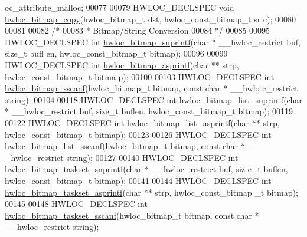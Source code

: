 \begin{DoxyCode}
      oc\_attribute\_malloc;
00077 
00079 HWLOC\_DECLSPEC \textcolor{keywordtype}{void} \hyperlink{a00065_gab14743355fa03b36cef521cbcd2fbf64}{hwloc_bitmap_copy}(hwloc\_bitmap\_t dst, hwloc\_const\_bitmap\_t sr
      c);
00080 
00081 
00082 \textcolor{comment}{/*}
00083 \textcolor{comment}{ * Bitmap/String Conversion}
00084 \textcolor{comment}{ */}
00085 
00095 HWLOC\_DECLSPEC \textcolor{keywordtype}{int} \hyperlink{a00065_ga6c0d60db98f27276752c1e5fafcbd7d1}{hwloc_bitmap_snprintf}(\textcolor{keywordtype}{char} * \_\_hwloc\_restrict buf, \textcolor{keywordtype}{size\_t} bufl
      en, hwloc\_const\_bitmap\_t bitmap);
00096 
00099 HWLOC\_DECLSPEC \textcolor{keywordtype}{int} \hyperlink{a00065_gad3cf87ceb58aa91656756bbb58057320}{hwloc_bitmap_asprintf}(\textcolor{keywordtype}{char} ** strp, hwloc\_const\_bitmap\_t bitma
      p);
00100 
00103 HWLOC\_DECLSPEC \textcolor{keywordtype}{int} \hyperlink{a00065_ga553cd5ceb1925bfd31788e70b4a46ae8}{hwloc_bitmap_sscanf}(hwloc\_bitmap\_t bitmap, const \textcolor{keywordtype}{char} * \_\_hwlo
      c\_restrict \textcolor{keywordtype}{string});
00104 
00118 HWLOC\_DECLSPEC \textcolor{keywordtype}{int} \hyperlink{a00065_gab94b52560ea4333663895b3276e89af2}{hwloc_bitmap_list_snprintf}(\textcolor{keywordtype}{char} * \_\_hwloc\_restrict buf, \textcolor{keywordtype}{size\_t
      } buflen, hwloc\_const\_bitmap\_t bitmap);
00119 
00122 HWLOC\_DECLSPEC \textcolor{keywordtype}{int} \hyperlink{a00065_ga600651f00d39d378f423acbd75d938d2}{hwloc_bitmap_list_asprintf}(\textcolor{keywordtype}{char} ** strp, hwloc\_const\_bitmap\_t 
      bitmap);
00123 
00126 HWLOC\_DECLSPEC \textcolor{keywordtype}{int} \hyperlink{a00065_gafe8fc90e7a9171e287cf1bfa11e85980}{hwloc_bitmap_list_sscanf}(hwloc\_bitmap\_t bitmap, const \textcolor{keywordtype}{char} * \_
      \_hwloc\_restrict \textcolor{keywordtype}{string});
00127 
00140 HWLOC\_DECLSPEC \textcolor{keywordtype}{int} \hyperlink{a00065_gae0e0619f43a4af5efafb75f489c1c6ec}{hwloc_bitmap_taskset_snprintf}(\textcolor{keywordtype}{char} * \_\_hwloc\_restrict buf, \textcolor{keywordtype}{siz
      e\_t} buflen, hwloc\_const\_bitmap\_t bitmap);
00141 
00144 HWLOC\_DECLSPEC \textcolor{keywordtype}{int} \hyperlink{a00065_gaa3df92e204ffb24ceddd44d8d58f6eaa}{hwloc_bitmap_taskset_asprintf}(\textcolor{keywordtype}{char} ** strp, hwloc\_const\_bitmap
      \_t bitmap);
00145 
00148 HWLOC\_DECLSPEC \textcolor{keywordtype}{int} \hyperlink{a00065_ga71b28ef0d7206e37adbb94468c03e1a9}{hwloc_bitmap_taskset_sscanf}(hwloc\_bitmap\_t bitmap, const \textcolor{keywordtype}{char} 
      * \_\_hwloc\_restrict \textcolor{keywordtype}{string});

\end{DoxyCode}
